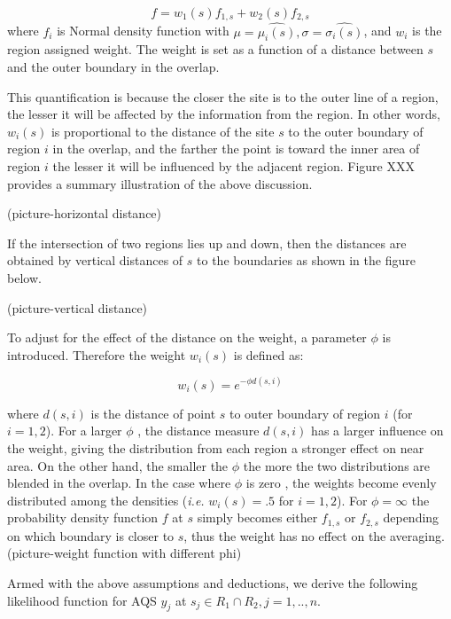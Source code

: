 \documentclass[10pt]{article}
\begin{document}
\begin{equation}\tag{1.1}\label{1.1}
f = w_{1}(s)f_{1,s} + w_{2}(s)f_{2,s}
\end{equation}
\justify
where $f_{i}$ is Normal density function with $\mu = \hat{\mu_{i}(s)}, \sigma = \hat{\sigma_{i}(s)}$, and $w_{i}$ is the region assigned weight.  The weight is set as a function of a distance between $s$ and the outer boundary in the overlap. 


\justify
This quantification is because the closer the site is to the outer line of a region, the lesser it will be affected by the information from the region.  In other words, $w_{i}(s)$ is proportional to the distance of the site $s$ to the outer boundary of region $i$ in the overlap, and the farther the point is toward the inner area of region $i$ the lesser it will be influenced by the adjacent region.  
Figure XXX provides a summary illustration of the above discussion.

(picture-horizontal distance)

\justify
If the intersection of two regions lies up and down, then the distances are obtained by vertical distances of $s$ to the boundaries as shown in the figure below.

(picture-vertical distance)

\justify
To adjust for the effect of the distance on the weight, a parameter $\phi$ is introduced.  Therefore the weight $w_{i}(s) $ is defined as:

\begin{equation}\tag{1.2}\label{1.2}
w_{i}(s) = e^{-\phi d(s,i)}
\end{equation}

\justify
where $d(s,i) $ is the  distance of point $s$ to outer boundary of region $i$ (for $i =  1,2$). For a  larger $\phi$ , the distance measure $d(s,i)$ has a  larger influence on the weight, giving the distribution from each region a stronger effect on near area.  
On the other hand, the smaller the $\phi$ the more the two distributions are blended in the overlap.  In the case where $\phi$ is zero , the weights become evenly distributed among the densities (\textit{i.e.} $w_{i}(s)=.5$ for $i=1,2$).  For $\phi=\infty$  the probability density function $f$ at $s$ simply becomes either $f_{1,s}$ or $f_{2,s}$ 
depending on which boundary is closer to $s$, thus the weight has no effect on the averaging.
(picture-weight function with different phi) 

\justify
Armed with the above assumptions and deductions, we derive the following likelihood function for  AQS $y_j$  at $s_j \in R_{1} \cap R_{2}  , j = 1,.., n.$
\end{document}
